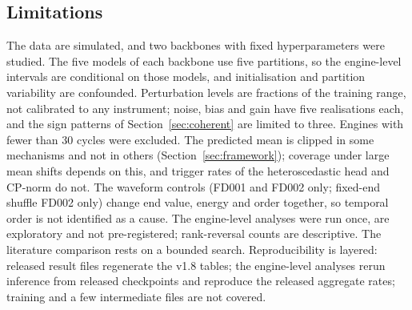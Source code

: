 \subsection{Limitations}
The data are simulated, and two backbones with fixed hyperparameters were studied. The five models of each backbone use five partitions, so the engine-level intervals are conditional on those models, and initialisation and partition variability are confounded. Perturbation levels are fractions of the training range, not calibrated to any instrument; noise, bias and gain have five realisations each, and the sign patterns of Section~\ref{sec:coherent} are limited to three. Engines with fewer than 30 cycles were excluded. The predicted mean is clipped in some mechanisms and not in others (Section~\ref{sec:framework}); coverage under large mean shifts depends on this, and trigger rates of the heteroscedastic head and CP-norm do not. The waveform controls (FD001 and FD002 only; fixed-end shuffle FD002 only) change end value, energy and order together, so temporal order is not identified as a cause. The engine-level analyses were run once, are exploratory and not pre-registered; rank-reversal counts are descriptive. The literature comparison rests on a bounded search. Reproducibility is layered: released result files regenerate the v1.8 tables; the engine-level analyses rerun inference from released checkpoints and reproduce the released aggregate rates; training and a few intermediate files are not covered.
